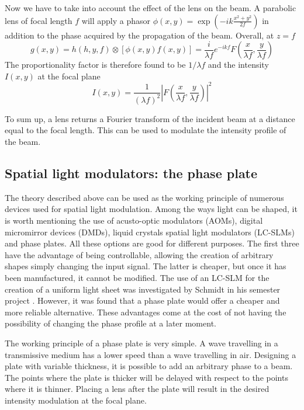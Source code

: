 Now we have to take into account the effect of the lens on the beam. A parabolic lens of focal length $f$ will apply a phasor $\phi(x,y) = \exp(-ik\frac{x^2+y^2}{2f})$ in addition to the phase acquired by the propagation of the beam. Overall, at $z=f$
\begin{equation}
    g(x,y) = h(h,y,f) \otimes \left[ \phi(x,y) f(x,y) \right]
    = \frac{i}{\lambda f} e^{-ikf} F\left(\frac{x}{\lambda f}, \frac{y}{\lambda f}\right)
\end{equation}
The proportionality factor is therefore found to be $1/\lambda f$
and the intensity $I(x,y)$ at the focal plane
\begin{equation}
    I(x,y) = \frac{1}{(\lambda f)^2} \left| F\left(\frac{x}{\lambda f}, \frac{y}{\lambda f}\right) \right|^2
\end{equation}

To sum up, a lens returns a Fourier transform of the incident beam at a distance equal to the focal length. This can be used to modulate the intensity profile of the beam.

\subsection{Spatial light modulators: the phase plate}
\label{sec:slm_phaseplate}
The theory described above can be used as the working principle of numerous devices used for spatial light modulation. Among the ways light can be shaped, it is worth mentioning the use of acusto-optic modulators (AOMs), digital micromirror devices (DMDs), liquid crystals spatial light modulators (LC-SLMs) and phase plates. All these options are good for different purposes. The first three have the advantage of being controllable, allowing the creation of arbitrary shapes simply changing the input signal. The latter is cheaper, but once it has been manufactured, it cannot be modified.
The use of an LC-SLM for the creation of a uniform light sheet was investigated by Schmidt in his semester project \cite{schmidt2021}. However, it was found that a phase plate would offer a cheaper and more reliable alternative. These advantages come at the cost of not having the possibility of changing the phase profile at a later moment.

The working principle of a phase plate is very simple. A wave travelling in a transmissive medium has a lower speed than a wave travelling in air. Designing a plate with variable thickness, it is possible to add an arbitrary phase to a beam. The points where the plate is thicker will be delayed with respect to the points where it is thinner. Placing a lens after the plate will result in the desired intensity modulation at the focal plane.

